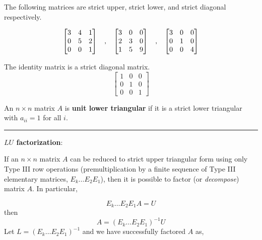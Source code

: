 \begin{example} The following matrices are strict upper, strict lower, and strict diagonal respectively.  


\[ \begin{bmatrix}  3 &  4 & 1\\ 0 & 5  &  2 \\  0 &  0 &  1   \end{bmatrix}   \text{\;\; ,  \;\;}
 \begin{bmatrix}  3 &  0  & 0\\ 2 & 3  &  0 \\  1 &  5 &  9   \end{bmatrix}    \text{\;\; ,  \;\;} 
    \begin{bmatrix}  3 &  0  & 0\\ 0 & 1  &  0 \\  0 &  0 &  4   \end{bmatrix} 
     \]
\end{example}






\begin{example} The identity matrix is a strict diagonal matrix.  
 \[
     \begin{bmatrix}  1 &  0  & 0\\ 0 & 1  &  0 \\  0 &  0 &  1   \end{bmatrix} 
     \]
\end{example}







\begin{definition}  An $n \times n$ matrix $A$ is  \textbf{unit lower triangular} if it is a strict lower triangular with $a_{ii} = 1$ for all $i$.  
\end{definition}


\rule[0.01in]{\textwidth}{0.0025in}

\textbf{$LU$ factorization}:

	If an $n \times n$ matrix $A$ can be reduced to strict upper triangular form using only Type III row operations (premultiplication by a finite sequence of Type III elementary matrices, $E_k \dots E_2 E_1$), then it is possible to factor (or \textit{decompose}) matrix $A$.  In particular, 
	
	\[  E_k \dots E_2 E_1 A = U  \]
	then
	 \[  A = (E_k \dots E_2 E_1 )^{-1} U  \] 
	 Let $L = (E_k \dots E_2 E_1 )^{-1}$ and we have successfully factored $A$ as, 
	 
